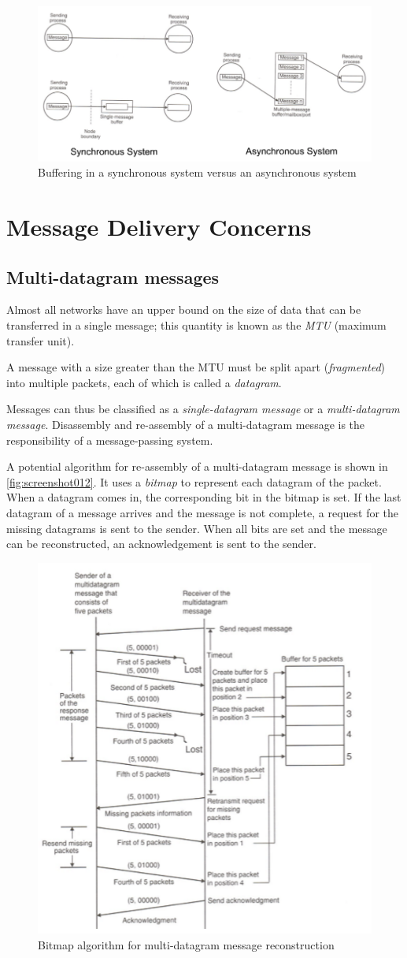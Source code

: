 \begin{figure}[h]
\centering
\includegraphics[width=0.9\linewidth]{figures/screenshot011}
\caption{Buffering in a synchronous system versus an asynchronous system}
\label{fig:screenshot011}
\end{figure}

\section{Message Delivery Concerns}
\subsection{Multi-datagram messages}
Almost all networks have an upper bound on the size of data that can be transferred in a single message; this quantity is known as the \textit{MTU} (maximum transfer unit).

A message with a size greater than the MTU must be split apart (\textit{fragmented}) into multiple packets, each of which is called a \textit{datagram}.

Messages can thus be classified as a \textit{single-datagram message} or a \textit{multi-datagram message}. Disassembly and re-assembly of a multi-datagram message is the responsibility of a message-passing system.

A potential algorithm for re-assembly of a multi-datagram message is shown in \autoref{fig:screenshot012}. It uses a \textit{bitmap} to represent each datagram of the packet. When a datagram comes in, the corresponding bit in the bitmap is set. If the last datagram of a message arrives and the message is not complete, a request for the missing datagrams is sent to the sender. When all bits are set and the message can be reconstructed, an acknowledgement is sent to the sender.

\begin{figure}[h]
\centering
\includegraphics[width=0.4\linewidth]{figures/screenshot012}
\caption{Bitmap algorithm for multi-datagram message reconstruction}
\label{fig:screenshot012}
\end{figure}

